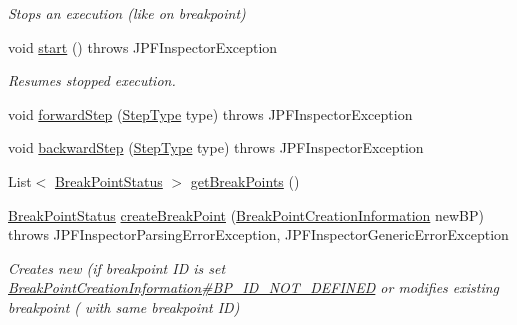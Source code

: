 \begin{DoxyCompactItemize}
\begin{DoxyCompactList}\small\item\em Stops an execution (like on breakpoint) \end{DoxyCompactList}\item 
void \hyperlink{interfacegov_1_1nasa_1_1jpf_1_1inspector_1_1interfaces_1_1_commands_interface_a4c7644c0aa203769bba68374c0cb07ea}{start} ()  throws J\+P\+F\+Inspector\+Exception
\begin{DoxyCompactList}\small\item\em Resumes stopped execution. \end{DoxyCompactList}\item 
void \hyperlink{interfacegov_1_1nasa_1_1jpf_1_1inspector_1_1interfaces_1_1_commands_interface_ad5c3596280086831444dcb06079c9412}{forward\+Step} (\hyperlink{enumgov_1_1nasa_1_1jpf_1_1inspector_1_1interfaces_1_1_commands_interface_1_1_step_type}{Step\+Type} type)  throws J\+P\+F\+Inspector\+Exception
\item 
void \hyperlink{interfacegov_1_1nasa_1_1jpf_1_1inspector_1_1interfaces_1_1_commands_interface_a6a6a733100d8162d5f18063519a88257}{backward\+Step} (\hyperlink{enumgov_1_1nasa_1_1jpf_1_1inspector_1_1interfaces_1_1_commands_interface_1_1_step_type}{Step\+Type} type)  throws J\+P\+F\+Inspector\+Exception
\item 
List$<$ \hyperlink{interfacegov_1_1nasa_1_1jpf_1_1inspector_1_1interfaces_1_1_break_point_status}{Break\+Point\+Status} $>$ \hyperlink{interfacegov_1_1nasa_1_1jpf_1_1inspector_1_1interfaces_1_1_break_point_manager_interface_a172b70b66d0f8f6564111ee60efede2c}{get\+Break\+Points} ()
\item 
\hyperlink{interfacegov_1_1nasa_1_1jpf_1_1inspector_1_1interfaces_1_1_break_point_status}{Break\+Point\+Status} \hyperlink{interfacegov_1_1nasa_1_1jpf_1_1inspector_1_1interfaces_1_1_break_point_manager_interface_a9a11e594662011fd492b60b6cbb8ffbf}{create\+Break\+Point} (\hyperlink{interfacegov_1_1nasa_1_1jpf_1_1inspector_1_1interfaces_1_1_break_point_creation_information}{Break\+Point\+Creation\+Information} new\+BP)  throws J\+P\+F\+Inspector\+Parsing\+Error\+Exception, J\+P\+F\+Inspector\+Generic\+Error\+Exception
\begin{DoxyCompactList}\small\item\em Creates new (if breakpoint ID is set \hyperlink{interfacegov_1_1nasa_1_1jpf_1_1inspector_1_1interfaces_1_1_break_point_creation_information_a24626231e3744e59f505d0731d4ca9e1}{Break\+Point\+Creation\+Information\#\+B\+P\+\_\+\+I\+D\+\_\+\+N\+O\+T\+\_\+\+D\+E\+F\+I\+N\+ED} or modifies existing breakpoint ( with same breakpoint ID) \end{DoxyCompactList}\item 

\end{DoxyCompactItemize}
